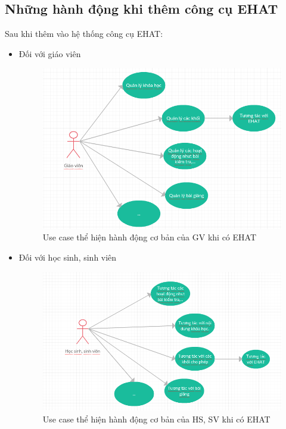 \subsection{Những hành động khi thêm công cụ EHAT}
Sau khi thêm vào hệ thống công cụ EHAT:
\begin{itemize}
	\item Đối với giáo viên
	\begin{center}
		\begin{figure}[htp]
			\begin{center}
				\includegraphics[scale=0.65]{img/usecasegvehat}
			\end{center}
			\caption{Use case thể hiện hành động cơ bản của GV khi có EHAT}
			\label{refhinh12}
		\end{figure}
	\end{center}
	\vskip 3cm
	\item Đối với học sinh, sinh viên
	\begin{center}
		\begin{figure}[htp]
			\begin{center}
				\includegraphics[scale=0.7]{img/usecasehsehat}
			\end{center}
			\caption{Use case thể hiện hành động cơ bản của HS, SV khi có EHAT}
			\label{refhinh13}
		\end{figure}
	\end{center}
\end{itemize}

